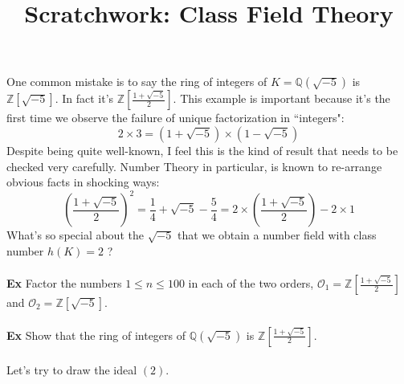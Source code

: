 \documentclass[12pt]{article}
\title{Scratchwork: Class Field Theory}
\date{}
\begin{document}
\sffamily

\maketitle

\noindent One common mistake is to say the ring of integers of $K =  \mathbb{Q}(\sqrt{-5})$ is $\mathbb{Z}[\sqrt{-5}]$.  In fact it's $\mathbb{Z}[\frac{1+\sqrt{-5}}{2}]$. This example is important because it's the first time we observe the failure of unique factorization in ``integers":
$$2 \times 3 = (1 + \sqrt{-5}) \times (1 - \sqrt{-5}) $$
Despite being quite well-known, I feel this is the kind of result that needs to be checked very carefully.  Number Theory in particular, is known to re-arrange obvious facts in shocking ways:
$$ \left( \frac{1 + \sqrt{-5}}{2} \right)^2 = \frac{1}{4} + \sqrt{-5} - \frac{5}{4} 
= 2 \times \left( \frac{1 + \sqrt{-5}}{2} \right) - 2 \times 1$$
What's so special about the $\sqrt{-5}$ that we obtain a number field with class number $h(K)=2$ ? \\ \\
\textbf{Ex} Factor the numbers $1 \leq n \leq 100$ in each of the two orders, $\mathcal{O}_1 = \mathbb{Z}\left[ \frac{1 + \sqrt{-5}}{2}\right]$ and $\mathcal{O}_2 = \mathbb{Z}[\sqrt{-5}]$. \\ \\
\textbf{Ex} Show that the ring of integers of $\mathbb{Q}(\sqrt{-5})$ is $\mathbb{Z}\left[ \frac{1 + \sqrt{-5}}{2}\right]$. \\ \\
Let's try to draw the ideal $(2)$. \\ \\
\end{document}
